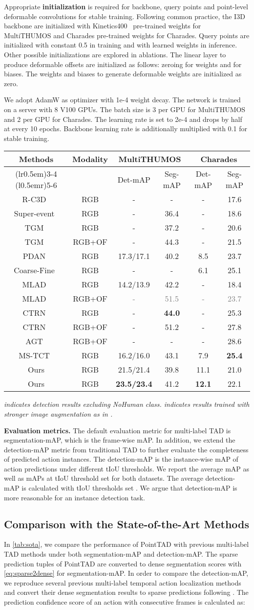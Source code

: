 \documentclass{article}
\renewcommand{\paragraph}[1]{\vspace{1.25mm}\noindent\textbf{#1}}
\newcommand{\headrule}{\toprule}
\newcommand{\TableSOTA}{
\begin{table*}[t]
\begin{threeparttable}
\centering
\small
    \renewcommand\arraystretch{0.9}
    \setlength{\tabcolsep}{13pt}
    \caption{\textbf{Comparison with the state of the art} on the MultiTHUMOS test set and Charades test set, under detection-mAP (\%) and segmentation-mAP(\%).}
\begin{tabular}{cccccc}
\headrule
\multirow{2}{*}{{Methods}}& \multirow{2}{*}{Modality}  & \multicolumn{2}{c}{MultiTHUMOS}               & \multicolumn{2}{c}{Charades} \\ \cmidrule(lr{0.5em}){3-4} \cmidrule(l{0.5em}r){5-6} 
\multicolumn{1}{c}{} & \multicolumn{1}{c}{} & Det-mAP & \multicolumn{1}{c}{Seg-mAP} & Det-mAP   & Seg-mAP  \\ 
\midrule
R-C3D~\cite{DBLP:conf/iccv/XuDS17}  & RGB & -       & -         & -        & {17.6}      \\
Super-event~\cite{DBLP:conf/cvpr/PiergiovanniR18}& RGB & -   & 36.4           & -        & 18.6       \\
TGM~\cite{DBLP:conf/icml/PiergiovanniR19}   & RGB & -         & 37.2         & -        & 20.6       \\
{\color{gray}TGM~\cite{DBLP:conf/icml/PiergiovanniR19} }  & {\color{gray}RGB+OF} & {\color{gray}-} & {\color{gray}44.3}  & {\color{gray}-} & {\color{gray}21.5}    \\
PDAN~\cite{DBLP:conf/wacv/DaiDMGFB21}& RGB &{17.3/17.1\footnotemark[3]}  & 40.2 & {8.5} & 23.7 \\
Coarse-Fine~\cite{DBLP:conf/cvpr/KahatapitiyaR21}  & RGB  & -  & -  & {6.1}   & 25.1   \\
MLAD~\cite{DBLP:conf/cvpr/TirupatturDRS21}    & RGB & {14.2/13.9\footnotemark[3]}  & 42.2  & - & 18.4 \\
{\color{gray}MLAD~\cite{DBLP:conf/cvpr/TirupatturDRS21}} & {\color{gray}RGB+OF} & \textcolor{gray}{-}& \textcolor{gray}{51.5} & \textcolor{gray}{-} & \textcolor{gray}{23.7} \\
CTRN~\cite{DBLP:conf/bmvc/DaiDB21}  & RGB & -  & {\bf 44.0}    & -       & {25.3}       \\
{\color{gray}CTRN~\cite{DBLP:conf/bmvc/DaiDB21}}  & {\color{gray}RGB+OF} & {\color{gray}-}  & {\color{gray}51.2}    & {\color{gray}-} & {\color{gray}27.8}       \\
{\color{gray}AGT~\cite{DBLP:journals/corr/abs-2101-08540}} & {\color{gray}RGB+OF}& {\color{gray}-} & {\color{gray}-} &{\color{gray}-}& {\color{gray}28.6} \\
MS-TCT~\cite{DBLP:conf/cvpr/DaiDKRB22}  & RGB & {16.2/16.0\footnotemark[3]}        & {43.1}     & {7.9}            & {\bf 25.4}       \\
\midrule
Ours      & RGB & {{ 21.5/21.4\footnotemark[3]}}         & 39.8                           & { 11.1}           & 21.0      \\
Ours\footnotemark[4]    & RGB & {{\bf 23.5/23.4\footnotemark[3]}}         & 41.2                         & {\bf 12.1}           & 22.1     \\
\bottomrule
\end{tabular}
\label{tab:sota}
\begin{tablenotes}
\item \small{\em \footnotemark[3] indicates detection results excluding NoHuman class. \footnotemark[4]indicates results trained with stronger image augmentation as in \cite{liu2022an}.}
\vspace{-4mm}
\end{tablenotes}
\end{threeparttable}
\end{table*}
}
\begin{document}
Appropriate {\bf initialization} is required for backbone, query points and point-level deformable convolutions for stable training. Following common practice, the I3D backbone are initialized with Kinetics400~\cite{DBLP:journals/corr/KayCSZHVVGBNSZ17} pre-trained weights for MultiTHUMOS and Charades pre-trained weights for Charades. Query points are initialized with constant 0.5 in training and with learned weights in inference. Other possible initializations are explored in ablations. The linear layer to produce deformable offsets are initialized as follows: zeroing for weights and  for biases. The weights and biases to generate deformable weights are initialized as zero. 

We adopt AdamW as optimizer with 1e-4 weight decay. The network is trained on a server with 8 V100 GPUs. {The batch size is 3 per GPU for MultiTHUMOS and 2 per GPU for Charades. The learning rate is set to 2e-4 and drops by half at every 10 epochs.} Backbone learning rate is additionally multiplied with 0.1 for stable training.

\TableSOTA

\paragraph{Evaluation metrics.}
The default evaluation metric for multi-label TAD is segmentation-mAP, which is the frame-wise mAP. In addition, we extend the detection-mAP metric from traditional TAD to further evaluate the completeness of predicted action instances. The detection-mAP is the instance-wise mAP of action predictions under different tIoU thresholds. We report the average mAP as well as mAPs at tIoU threshold set  for both datasets. The average detection-mAP is calculated with tIoU thresholds set . We argue that detection-mAP is more reasonable for an instance detection task. 



\subsection{Comparison with the State-of-the-Art Methods}

In \cref{tab:sota}, we compare the performance of PointTAD with previous multi-label TAD methods under both segmentation-mAP and detection-mAP. The sparse prediction tuples of PointTAD are converted to dense segmentation scores with \cref{eq:sparse2dense} for segmentation-mAP. In order to compare the detection-mAP, we reproduce several previous multi-label temporal action localization methods and convert their dense segmentation results to sparse predictions following \cite{DBLP:journals/ijcv/YeungRJAMF18}. 
The prediction confidence score of an action with  consecutive frames is calculated as: 
\end{document}
